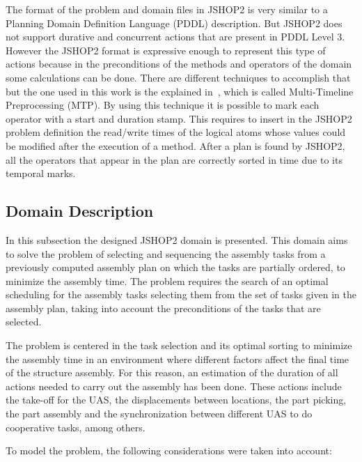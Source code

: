 \documentclass[letterpaper, 12pt, conference]{ieeeconf}    %
\begin{document}
The format of the problem and domain files in JSHOP2 is very similar to a Planning Domain Definition Language (PDDL) description. But JSHOP2 does not support durative and concurrent actions that are present in PDDL Level 3. However the JSHOP2 format is expressive enough to represent this type of actions because in the preconditions of the methods and operators of the domain some calculations can be done. There are different techniques to accomplish that but the one used in this work is the explained in~\cite{Nau03shop2}, which is called Multi-Timeline Preprocessing (MTP). By using this technique it is possible to mark each operator with a start and duration stamp. This requires to insert in the JSHOP2 problem definition the read/write times of the logical atoms whose values could be modified after the execution of a method. After a plan is found by JSHOP2, all the operators that appear in the plan are correctly sorted in time due to its temporal marks. 

\subsection{Domain Description}
    \label{sec:ddesc}
    
In this subsection the designed JSHOP2 domain is presented. This domain aims to solve the problem of selecting and sequencing the assembly tasks from a previously computed assembly plan on which the tasks are partially ordered, to minimize the assembly time. The problem requires the search of an optimal scheduling for the assembly tasks selecting them from the set of tasks given in the assembly plan, taking into account the preconditions of the tasks that are selected.

The problem is centered in the task selection and its optimal sorting to minimize the assembly time in an environment where different factors affect the final time of the structure assembly. For this reason, an estimation of the duration of all actions needed to carry out the assembly has been done. These actions include the take-off for the UAS, the displacements between locations, the part picking, the part assembly and the synchronization between different UAS to do cooperative tasks, among others.

To model the problem, the following considerations were taken into account:
\end{document}
